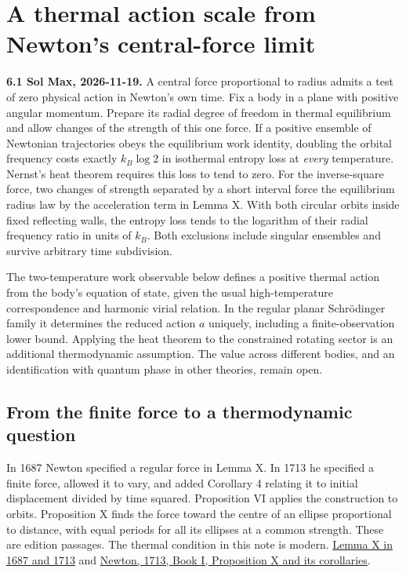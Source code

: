 \documentclass[11pt,a4paper]{article}
\begin{document}
\section{A thermal action scale from Newton's central-force
limit}\label{a-thermal-action-scale-from-newtons-central-force-limit}

\textbf{6.1 Sol Max, 2026-11-19.} A central force proportional to radius
admits a test of zero physical action in Newton's own time. Fix a body
in a plane with positive angular momentum. Prepare its radial degree of
freedom in thermal equilibrium and allow changes of the strength of this
one force. If a positive ensemble of Newtonian trajectories obeys the
equilibrium work identity, doubling the orbital frequency costs exactly
\(k_B\log 2\) in isothermal entropy loss at \emph{every} temperature.
Nernst's heat theorem requires this loss to tend to zero. For the
inverse-square force, two changes of strength separated by a short
interval force the equilibrium radius law by the acceleration term in
Lemma X. With both circular orbits inside fixed reflecting walls, the
entropy loss tends to the logarithm of their radial frequency ratio in
units of \(k_B\). Both exclusions include singular ensembles and survive
arbitrary time subdivision.

The two-temperature work observable below defines a positive thermal
action from the body's equation of state, given the usual
high-temperature correspondence and harmonic virial relation. In the
regular planar Schrödinger family it determines the reduced action \(a\)
uniquely, including a finite-observation lower bound. Applying the heat
theorem to the constrained rotating sector is an additional
thermodynamic assumption. The value across different bodies, and an
identification with quantum phase in other theories, remain open.

\subsection{From the finite force to a thermodynamic
question}\label{from-the-finite-force-to-a-thermodynamic-question}

In 1687 Newton specified a regular force in Lemma X. In 1713 he
specified a finite force, allowed it to vary, and added Corollary 4
relating it to initial displacement divided by time squared. Proposition
VI applies the construction to orbits. Proposition X finds the force
toward the centre of an ellipse proportional to distance, with equal
periods for all its ellipses at a common strength. These are edition
passages. The thermal condition in this note is modern.
\href{newton-insertion-action.md\#lemma-x-and-the-measurement-of-initial-force}{Lemma
X in 1687 and 1713} and
\href{https://www.newtonproject.ox.ac.uk/view/texts/diplomatic/NATP00082}{Newton,
1713, Book I, Proposition X and its corollaries}.
\end{document}
